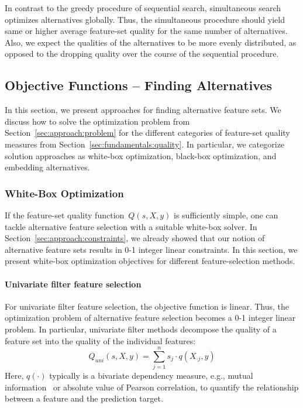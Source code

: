\documentclass{article}
\theoremstyle{definition}
\begin{document}
In contrast to the greedy procedure of sequential search, simultaneous search optimizes alternatives globally.
Thus, the simultaneous procedure should yield same or higher average feature-set quality for the same number of alternatives.
Also, we expect the qualities of the alternatives to be more evenly distributed, as opposed to the dropping quality over the course of the sequential procedure.

\subsection{Objective Functions -- Finding Alternatives}
\label{sec:approach:objectives}

In this section, we present approaches for finding alternative feature sets.
We discuss how to solve the optimization problem from Section~\ref{sec:approach:problem} for the different categories of feature-set quality measures from Section~\ref{sec:fundamentals:quality}.
In particular, we categorize solution approaches as white-box optimization, black-box optimization, and embedding alternatives.

\subsubsection{White-Box Optimization}
\label{sec:approach:objectives:white-box}

If the feature-set quality function~$Q(s,X,y)$ is sufficiently simple, one can tackle alternative feature selection with a suitable white-box solver.
In Section~\ref{sec:approach:constraints}, we already showed that our notion of alternative feature sets results in 0-1 integer linear constraints.
In this section, we present white-box optimization objectives for different feature-selection methods.

\paragraph{Univariate filter feature selection}

For univariate filter feature selection, the objective function is linear.
Thus, the optimization problem of alternative feature selection becomes a 0-1 integer linear problem.
In particular, univariate filter methods decompose the quality of a feature set into the quality of the individual features:
%
\begin{equation}
	Q_{uni}(s,X,y) = \sum_{j=1}^{n} s_j  \cdot q(X_{\cdot{}j},y)
	\label{eq:univariate-filter}
\end{equation}
%
Here, $q(\cdot)$ typically is a bivariate dependency measure, e.g., mutual information~\cite{kraskov2004estimating} or absolute value of Pearson correlation, to quantify the relationship between a feature and the prediction target.
\end{document}
